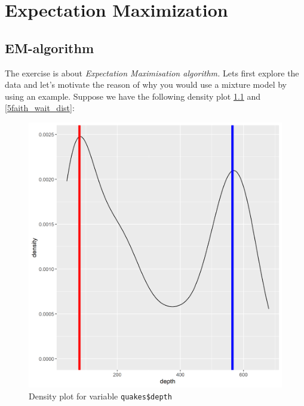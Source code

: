 \chapter{Expectation Maximization}

\section{EM-algorithm}
The exercise is about \emph{Expectation Maximisation algorithm.} 
Lets first explore the data and let’s motivate the reason of why you would use a mixture model by using an example. Suppose we have the following density plot \ref{5quakes_depth_dist} and \ref{5faith_wait_dist}:

\begin{figure}[h]
\centering
\includegraphics[scale=0.7, keepaspectratio]{ex5/5quakes_depth_dist.png}
\caption{Density plot for  variable \texttt{quakes\$depth}}
\label{5quakes_depth_dist}
\end{figure} 


